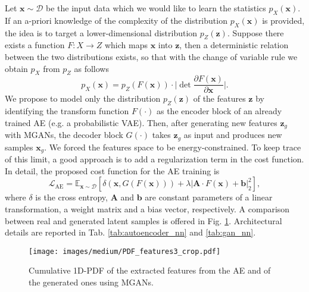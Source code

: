 Let $\mathbf{x} \sim \mathcal{D}$ be the input data which we would like to learn the statistics $p_{X}(\mathbf{x})$. If an a-priori knowledge of the complexity of the distribution $p_{X}(\mathbf{x})$ is provided, the idea is to target a lower-dimensional distribution $p_{Z}(\mathbf{z})$. Suppose there exists a function $F: X\to Z$ which maps $\mathbf{x}$ into $\mathbf{z}$, then a deterministic relation between the two distributions exists, so that with the change of variable rule we obtain $p_{X}$ from $p_{Z}$ as follows
\begin{equation}
p_{X}(\mathbf{x}) = p_{Z}(F(\mathbf{x}))\cdot \biggl| \det \frac{\partial F(\mathbf{x})}{\partial \mathbf{x}}\biggr|.
\label{eq:medium_NICE}
\end{equation}
We propose to model only the distribution $p_{Z}(\mathbf{z})$ of the features $\mathbf{z}$ by identifying the transform function $F(\cdot)$ as the encoder block of an already trained AE (e.g. a probabilistic VAE). Then, after generating new features $\mathbf{z}_g$ with MGANs, the decoder block $G(\cdot)$ takes $\mathbf{z}_g$ as input and produces new samples $\mathbf{x}_g$. 
We forced the features space to be energy-constrained. To keep trace of this limit, a good approach is to add a regularization term in the cost function. In detail, the proposed cost function for the AE training is
\begin{equation}
\label{PowerAE}
\mathcal{L}_{\text{AE}} = \mathbb{E}_{\mathbf{x}\sim \mathcal{D}}[\delta(\mathbf{x},G(F(\mathbf{x})))+\lambda | \mathbf{A}\cdot F(\mathbf{x})+\mathbf{b}|^2_2],
\end{equation}
where $\delta$ is the cross entropy, $\mathbf{A}$ and $\mathbf{b}$ are constant parameters of a linear transformation, a weight matrix and a bias vector, respectively. A comparison between real and generated latent samples is offered in Fig. \ref{fig:medium_Features}. Architectural details are reported in Tab. \ref{tab:autoencoder_nn} and \ref{tab:gan_nn}.

\begin{figure}
  \centering
	\texttt{[image: images/medium/PDF\_features3\_crop.pdf]}
	\caption{Cumulative 1D-PDF of the extracted features from the AE and of the generated ones using MGANs.}
	\label{fig:medium_Features}
\end{figure}

